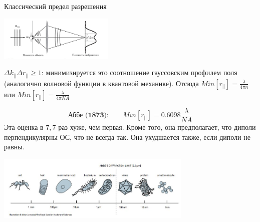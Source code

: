 \documentclass[9pt, compress, xcolor=table]{beamer}
\begin{document}
\begin{frame}{Классический предел разрешения}

\begin{center}
\includegraphics[width=5.5cm]{fig4_03}
\end{center}

{\small $\Delta k_{||} \Delta r_{||} \geq 1$: минимизируется это соотношение гауссовским
профилем поля (аналогично волновой функции в квантовой механике). Отсюда $ Min [r_{||}] =
\frac{\lambda}{4 \pi n}$ или $Min [r_{||}] = \frac{\lambda}{4 \pi NA}$}

\begin{equation*}
\boxed{
\textbf{Аббе (1873):}\qquad Min [r_{||}] = 0.6098\frac{\lambda}{NA}}
\end{equation*}
{\small Эта оценка в $7,7$ раз хуже, чем первая. Кроме того, она предполагает, что диполи
перпендикулярны ОС, что не всегда так. Она ухудшается также, если диполи не равны.}

\begin{center}
\includegraphics[width=0.7\textwidth]{ffm0}
\end{center}

\end{frame}
\end{document}

